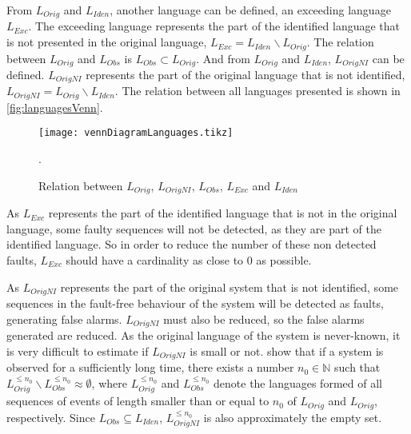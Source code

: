 From $L_{Orig}$ and $L_{Iden}$, another language can be defined, an exceeding
language $L_{Exc}$. The exceeding language represents the part of the identified language that is not presented in the
original language, $L_{Exc}=L_{Iden}\backslash L_{Orig}$.  The
relation between $L_{Orig}$ and $L_{Obs}$ is $L_{Obs} \subset L_{Orig}$.
And from
$L_{Orig}$ and $L_{Iden}$, $L_{OrigNI}$ can be defined. $L_{OrigNI}$
represents the part of the
original language that is not identified, $L_{OrigNI}=L_{Orig}\backslash L_{Iden}$.
The relation between all languages presented is shown in \autoref{fig:languagesVenn}.

\usetikzlibrary{patterns}
\begin{figure}[H]
  \centering
    \texttt{[image: vennDiagramLanguages.tikz]}
  \caption{Relation between $L_{Orig}$, $L_{OrigNI}$,
    $L_{Obs}$, $L_{Exc}$ and $L_{Iden}$}.
  
  \label{fig:languagesVenn}
\end{figure}
As $L_{Exc}$ represents the part of the identified language that is not in
the original language, some faulty sequences will not be detected, as they are
part of the identified language. So in order to reduce the number of these non
detected faults, $L_{Exc}$ should have a cardinality as close to $0$ as 
possible.

As $L_{OrigNI}$ represents the part of the original system that is not
identified, some sequences in the fault-free behaviour of the
system will be detected as faults, generating false alarms. $L_{OrigNI}$ must
also be reduced, so the false alarms generated are reduced. As the original
language of the system is never-known, it is very difficult to estimate if
$L_{OrigNI}$ is small or not. \cite{klein2005fault} show that if a system is
observed for a sufficiently long time, there exists a number $n_0\in \mathbb{N}$
such that $L_{Orig}^{\leq n_0}\backslash L_{Obs}^{\leq n_0}\approx \emptyset$,
where $L_{Orig}^{\leq n_0}$ and $L_{Obs}^{\leq n_0}$ denote the languages formed
of all sequences of events of length smaller than or equal to $n_0$ of
$L_{Orig}$ and $L_{Orig}$, respectively. Since $L_{Obs}\subseteq L_{Iden}$, $L_{OrigNI}^{\leq
  n_0}$ is also approximately the empty set.

